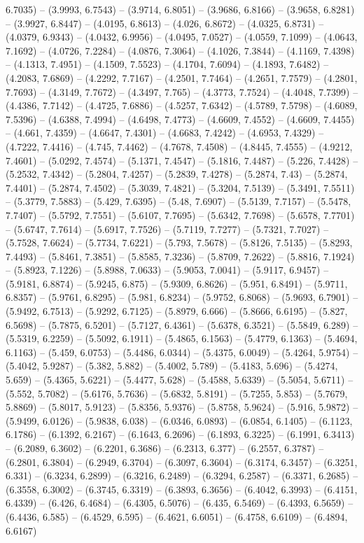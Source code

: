 6.7035) -- (3.9993, 6.7543) -- (3.9714, 6.8051) -- (3.9686, 6.8166) -- (3.9658, 6.8281) -- (3.9927, 6.8447) -- (4.0195, 6.8613) -- (4.026, 6.8672) -- (4.0325, 6.8731) -- (4.0379, 6.9343) -- (4.0432, 6.9956) -- (4.0495, 7.0527) -- (4.0559, 7.1099) -- (4.0643, 7.1692) -- (4.0726, 7.2284) -- (4.0876, 7.3064) -- (4.1026, 7.3844) -- (4.1169, 7.4398) -- (4.1313, 7.4951) -- (4.1509, 7.5523) -- (4.1704, 7.6094) -- (4.1893, 7.6482) -- (4.2083, 7.6869) -- (4.2292, 7.7167) -- (4.2501, 7.7464) -- (4.2651, 7.7579) -- (4.2801, 7.7693) -- (4.3149, 7.7672) -- (4.3497, 7.765) -- (4.3773, 7.7524) -- (4.4048, 7.7399) -- (4.4386, 7.7142) -- (4.4725, 7.6886) -- (4.5257, 7.6342) -- (4.5789, 7.5798) -- (4.6089, 7.5396) -- (4.6388, 7.4994) -- (4.6498, 7.4773) -- (4.6609, 7.4552) -- (4.6609, 7.4455) -- (4.661, 7.4359) -- (4.6647, 7.4301) -- (4.6683, 7.4242) -- (4.6953, 7.4329) -- (4.7222, 7.4416) -- (4.745, 7.4462) -- (4.7678, 7.4508) -- (4.8445, 7.4555) -- (4.9212, 7.4601) -- (5.0292, 7.4574) -- (5.1371, 7.4547) -- (5.1816, 7.4487) -- (5.226, 7.4428) -- (5.2532, 7.4342) -- (5.2804, 7.4257) -- (5.2839, 7.4278) -- (5.2874, 7.43) -- (5.2874, 7.4401) -- (5.2874, 7.4502) -- (5.3039, 7.4821) -- (5.3204, 7.5139) -- (5.3491, 7.5511) -- (5.3779, 7.5883) -- (5.429, 7.6395) -- (5.48, 7.6907) -- (5.5139, 7.7157) -- (5.5478, 7.7407) -- (5.5792, 7.7551) -- (5.6107, 7.7695) -- (5.6342, 7.7698) -- (5.6578, 7.7701) -- (5.6747, 7.7614) -- (5.6917, 7.7526) -- (5.7119, 7.7277) -- (5.7321, 7.7027) -- (5.7528, 7.6624) -- (5.7734, 7.6221) -- (5.793, 7.5678) -- (5.8126, 7.5135) -- (5.8293, 7.4493) -- (5.8461, 7.3851) -- (5.8585, 7.3236) -- (5.8709, 7.2622) -- (5.8816, 7.1924) -- (5.8923, 7.1226) -- (5.8988, 7.0633) -- (5.9053, 7.0041) -- (5.9117, 6.9457) -- (5.9181, 6.8874) -- (5.9245, 6.875) -- (5.9309, 6.8626) -- (5.951, 6.8491) -- (5.9711, 6.8357) -- (5.9761, 6.8295) -- (5.981, 6.8234) -- (5.9752, 6.8068) -- (5.9693, 6.7901) -- (5.9492, 6.7513) -- (5.9292, 6.7125) -- (5.8979, 6.666) -- (5.8666, 6.6195) -- (5.827, 6.5698) -- (5.7875, 6.5201) -- (5.7127, 6.4361) -- (5.6378, 6.3521) -- (5.5849, 6.289) -- (5.5319, 6.2259) -- (5.5092, 6.1911) -- (5.4865, 6.1563) -- (5.4779, 6.1363) -- (5.4694, 6.1163) -- (5.459, 6.0753) -- (5.4486, 6.0344) -- (5.4375, 6.0049) -- (5.4264, 5.9754) -- (5.4042, 5.9287) -- (5.382, 5.882) -- (5.4002, 5.789) -- (5.4183, 5.696) -- (5.4274, 5.659) -- (5.4365, 5.6221) -- (5.4477, 5.628) -- (5.4588, 5.6339) -- (5.5054, 5.6711) -- (5.552, 5.7082) -- (5.6176, 5.7636) -- (5.6832, 5.8191) -- (5.7255, 5.853) -- (5.7679, 5.8869) -- (5.8017, 5.9123) -- (5.8356, 5.9376) -- (5.8758, 5.9624) -- (5.916, 5.9872) -- (5.9499, 6.0126) -- (5.9838, 6.038) -- (6.0346, 6.0893) -- (6.0854, 6.1405) -- (6.1123, 6.1786) -- (6.1392, 6.2167) -- (6.1643, 6.2696) -- (6.1893, 6.3225) -- (6.1991, 6.3413) -- (6.2089, 6.3602) -- (6.2201, 6.3686) -- (6.2313, 6.377) -- (6.2557, 6.3787) -- (6.2801, 6.3804) -- (6.2949, 6.3704) -- (6.3097, 6.3604) -- (6.3174, 6.3457) -- (6.3251, 6.331) -- (6.3234, 6.2899) -- (6.3216, 6.2489) -- (6.3294, 6.2587) -- (6.3371, 6.2685) -- (6.3558, 6.3002) -- (6.3745, 6.3319) -- (6.3893, 6.3656) -- (6.4042, 6.3993) -- (6.4151, 6.4339) -- (6.426, 6.4684) -- (6.4305, 6.5076) -- (6.435, 6.5469) -- (6.4393, 6.5659) -- (6.4436, 6.585) -- (6.4529, 6.595) -- (6.4621, 6.6051) -- (6.4758, 6.6109) -- (6.4894, 6.6167) 